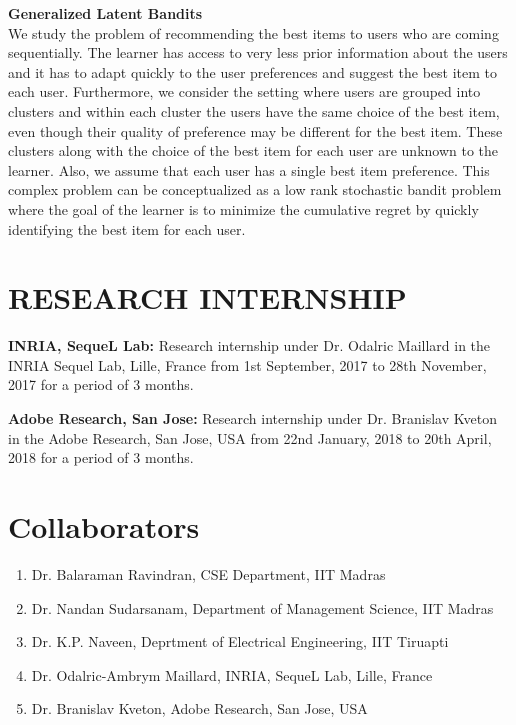 \documentclass[margin,11pt]{res}
\begin{document}
\begin{resume}
\textbf{Generalized Latent Bandits}\\
 We study the problem of recommending the best items to users who are coming sequentially. The learner has access to very less prior information about the users and it has to adapt quickly to the user preferences and suggest the best item to each user. Furthermore, we consider the setting where users are grouped into clusters and within each cluster the users have the same choice of the best item, even though their quality of preference may be different for the best item. These clusters along with the choice of the best item for each user are unknown to the learner.  Also, we assume that each user has a single best item preference. This complex problem can be conceptualized as a low rank stochastic bandit problem where the goal of the learner is to minimize the cumulative regret by quickly identifying the best item for each user.


\section{RESEARCH INTERNSHIP}
\textbf{INRIA, SequeL Lab:} Research internship under Dr. Odalric Maillard in the INRIA Sequel Lab, Lille, France from 1st September, 2017 to 28th November, 2017 for a period of 3 months.

\textbf{Adobe Research, San Jose:} Research internship under Dr. Branislav Kveton in the Adobe Research, San Jose, USA from 22nd January, 2018 to 20th April, 2018 for a period of 3 months.

\section{Collaborators}
\begin{enumerate}
\item Dr. Balaraman Ravindran, CSE Department, IIT Madras
\item Dr. Nandan Sudarsanam, Department of Management Science, IIT Madras
\item Dr. K.P. Naveen, Deprtment of Electrical Engineering, IIT Tiruapti
\item Dr. Odalric-Ambrym Maillard, INRIA, SequeL Lab, Lille, France
\item Dr. Branislav Kveton, Adobe Research, San Jose, USA
\end{enumerate}


\end{resume}
\end{document}
